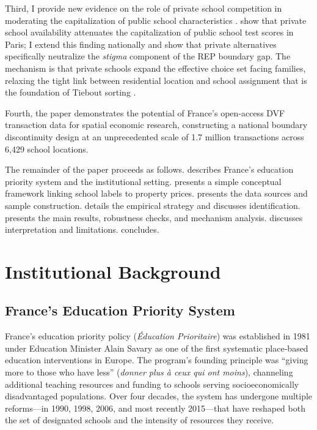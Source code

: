 \documentclass[12pt]{article}
\begin{document}
Third, I provide new evidence on the role of private school competition in moderating the capitalization of public school characteristics \citep{hoxby2000, nechyba2006, fack2010}. \citet{fack2010} show that private school availability attenuates the capitalization of public school test scores in Paris; I extend this finding nationally and show that private alternatives specifically neutralize the \textit{stigma} component of the REP boundary gap. The mechanism is that private schools expand the effective choice set facing families, relaxing the tight link between residential location and school assignment that is the foundation of Tiebout sorting \citep{tiebout1956}.

Fourth, the paper demonstrates the potential of France's open-access DVF transaction data for spatial economic research, constructing a national boundary discontinuity design at an unprecedented scale of 1.7 million transactions across 6,429 school locations.

The remainder of the paper proceeds as follows.  describes France's education priority system and the institutional setting.  presents a simple conceptual framework linking school labels to property prices.  presents the data sources and sample construction.  details the empirical strategy and discusses identification.  presents the main results, robustness checks, and mechanism analysis.  discusses interpretation and limitations.  concludes.


\section{Institutional Background}\label{sec:background}

\subsection{France's Education Priority System}

France's education priority policy (\textit{\'{E}ducation Prioritaire}) was established in 1981 under Education Minister Alain Savary as one of the first systematic place-based education interventions in Europe. The program's founding principle was ``giving more to those who have less'' (\textit{donner plus \`{a} ceux qui ont moins}), channeling additional teaching resources and funding to schools serving socioeconomically disadvantaged populations. Over four decades, the system has undergone multiple reforms---in 1990, 1998, 2006, and most recently 2015---that have reshaped both the set of designated schools and the intensity of resources they receive.
\end{document}
